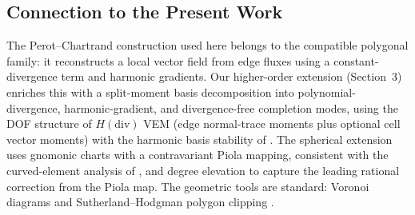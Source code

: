\subsection{Connection to the Present Work}

The Perot--Chartrand construction used here \cite{PerotChartrand2021}
belongs to the compatible polygonal family: it reconstructs a local vector
field from edge fluxes using a constant-divergence term and harmonic
gradients.  Our higher-order extension (Section~3) enriches this with a
split-moment basis decomposition into polynomial-divergence, harmonic-gradient,
and divergence-free completion modes, using the DOF structure
of $H(\mathrm{div})$ VEM \cite{veigaHdivVEM2016} (edge normal-trace moments
plus optional cell vector moments) with the harmonic basis stability of
\cite{cockburnHarmonic2010}.  The spherical extension uses gnomonic charts with
a contravariant Piola mapping, consistent with the curved-element analysis of
\cite{lipnikovCurvedMFD2023}, and degree elevation to capture the leading
rational correction from the Piola map.  The geometric tools are standard:
Voronoi diagrams \cite{Aurenhammer1991} and Sutherland--Hodgman polygon
clipping \cite{SutherlandHodgman1974}.
